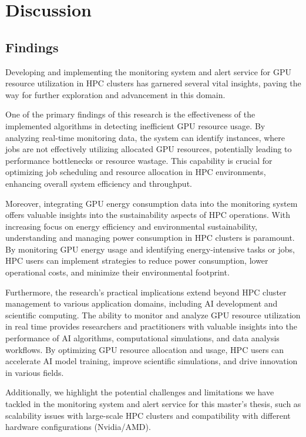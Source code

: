 \chapter{Discussion}
\label{chap:discussion}
\section{Findings}
Developing and implementing the monitoring system and alert service for GPU resource utilization in HPC clusters has garnered several vital insights, paving the way for further exploration and advancement in this domain.

One of the primary findings of this research is the effectiveness of the implemented algorithms in detecting inefficient GPU resource usage. By analyzing real-time monitoring data, the system can identify instances, where jobs are not effectively utilizing allocated GPU resources, potentially leading to performance bottlenecks or resource wastage. This capability is crucial for optimizing job scheduling and resource allocation in HPC environments, enhancing overall system efficiency and throughput.

Moreover, integrating GPU energy consumption data into the monitoring system offers valuable insights into the sustainability aspects of HPC operations. With increasing focus on energy efficiency and environmental sustainability, understanding and managing power consumption in HPC clusters is paramount. By monitoring GPU energy usage and identifying energy-intensive tasks or jobs, HPC users can implement strategies to reduce power consumption, lower operational costs, and minimize their environmental footprint.

Furthermore, the research's practical implications extend beyond HPC cluster management to various application domains, including AI development and scientific computing. The ability to monitor and analyze GPU resource utilization in real time provides researchers and practitioners with valuable insights into the performance of AI algorithms, computational simulations, and data analysis workflows. By optimizing GPU resource allocation and usage, HPC users can accelerate AI model training, improve scientific simulations, and drive innovation in various fields.

Additionally, we highlight the potential challenges and limitations we have tackled in the monitoring system and alert service for this master's thesis, such as scalability issues with large-scale HPC clusters and compatibility with different hardware configurations (Nvidia/AMD).

